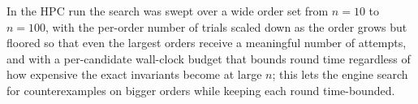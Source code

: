 \documentclass[]{ceurart}
\begin{document}
In the HPC run the search was swept over a wide order set from $n = 10$ to $n = 100$, with the per-order number of trials scaled down as the order grows but floored so that even the largest orders receive a meaningful number of attempts, and with a per-candidate wall-clock budget that bounds round time regardless of how expensive the exact invariants become at
large $n$; this lets the engine search for counterexamples on bigger orders while
keeping each round time-bounded.
\end{document}
